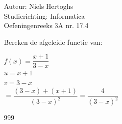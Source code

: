 \documentclass[a4paper]{article}
\begin{document}
\noindent \large Auteur: Niels Hertoghs    \\
\noindent \large Studierichting: Informatica\\
\noindent \large Oefeningenreeks 3A nr. 17.4\\

\medskip

\normalsize

Bereken de afgeleide functie van:



$f(x) = \dfrac{x + 1}{3 - x}$\\

$u = x + 1$ \\

$v = 3 - x$ \\

$=\dfrac{(3 - x) + (x + 1)}{(3 - x)^2} = \dfrac{4}{(3 - x)^2}$



\begin{thebibliography}{999}

\end{thebibliography}
\end{document}
